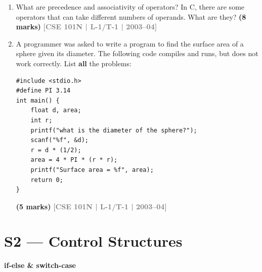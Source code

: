 \documentclass[12pt,a3paper]{article}
\newcommand{\yr}[1]{\hfill\textcolor{gray}{\small\textbf{[#1]}}}
\newcommand{\mk}[1]{\textcolor{orange!70!black}{\small\textbf{(#1 marks)}}}
\newcommand{\subtopic}[2]{%
  \vspace{10pt}
  \noindent\begin{tcolorbox}[colback=#1!8,colframe=#1,boxrule=0.6pt,arc=4pt,
    left=6pt,right=6pt,top=4pt,bottom=4pt]
    \small\bfseries\textcolor{#1}{#2}
  \end{tcolorbox}
  \vspace{2pt}
}
\begin{document}
\begin{enumerate}
\begin{lstlisting}
int var = 5;
printf("%d %d %d %d", var, ++var, var++, var);
\end{lstlisting}
\mk{8} \yr{CSE 105 | L-1/T-2 | 2005--06}

\item What are precedence and associativity of operators? In C, there are some operators that can take different numbers of operands. What are they?
\mk{8} \yr{CSE 101N | L-1/T-1 | 2003--04}

\item A programmer was asked to write a program to find the surface area of a sphere given its diameter. The following code compiles and runs, but does not work correctly. List \textbf{all} the problems:
 
\begin{lstlisting}
#include <stdio.h>
#define PI 3.14
int main() {
    float d, area;
    int r;
    printf("what is the diameter of the sphere?");
    scanf("%f", &d);
    r = d * (1/2);
    area = 4 * PI * (r * r);
    printf("Surface area = %f", area);
    return 0;
}
\end{lstlisting}
\mk{5} \yr{CSE 101N | L-1/T-1 | 2003--04}

\end{enumerate}

\section{S2 --- Control Structures}
\label{sec:S2}

\subtopic{cA}{if-else \& switch-case}
\label{sub:s2-ifelse}
\end{document}
